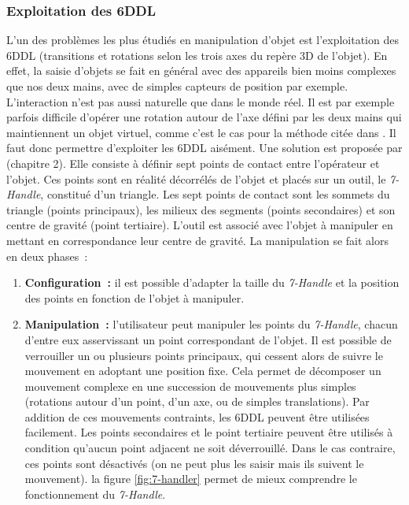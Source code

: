 \documentclass[11pt]{article}
\begin{document}
\subsubsection{Exploitation des 6DDL}
L'un des problèmes les plus étudiés en manipulation d'objet est l'exploitation des 6DDL (transitions et rotations selon les trois axes du repère 3D de l'objet). En effet, la saisie d'objets se fait en général avec des appareils bien moins complexes que nos deux mains, avec de simples capteurs de position par exemple. L'interaction n'est pas aussi naturelle que dans le monde réel. Il est par exemple parfois difficile d'opérer une rotation autour de l'axe défini par les deux mains qui maintiennent un objet virtuel, comme c'est le cas pour la méthode citée dans \cite{2-hands}. Il faut donc permettre d'exploiter les 6DDL aisément. Une solution est proposée par \cite{thesis} (chapitre 2). Elle consiste à définir sept points de contact entre l'opérateur et l'objet. Ces points sont en réalité décorrélés de l'objet et placés sur un outil, le \textit{7-Handle}, constitué d'un triangle. Les sept points de contact sont les sommets du triangle (points principaux), les milieux des segments (points secondaires) et son centre de gravité (point tertiaire). L'outil est associé avec l'objet à manipuler en mettant en correspondance leur centre de gravité. La manipulation se fait alors en deux phases~:
\begin{enumerate}
	\item \textbf{Configuration~:} il est possible d'adapter la taille du \textit{7-Handle} et la position des points en fonction de l'objet à manipuler.
	\item \textbf{Manipulation~:} l'utilisateur peut manipuler les points du \textit{7-Handle}, chacun d'entre eux asservissant un point correspondant de l'objet. Il est possible de verrouiller un ou plusieurs points principaux, qui cessent alors de suivre le mouvement en adoptant une position fixe. Cela permet de décomposer un mouvement complexe en une succession de mouvements plus simples (rotations autour d'un point, d'un axe, ou de simples translations). Par addition de ces mouvements contraints, les 6DDL peuvent être utilisées facilement. Les points secondaires et le point tertiaire peuvent être utilisés à condition qu'aucun point adjacent ne soit déverrouillé. Dans le cas contraire, ces points sont désactivés (on ne peut plus les saisir mais ils suivent le mouvement). la figure \ref{fig:7-handler} permet de mieux comprendre le fonctionnement du \textit{7-Handle}.
\end{enumerate}
\end{document}
